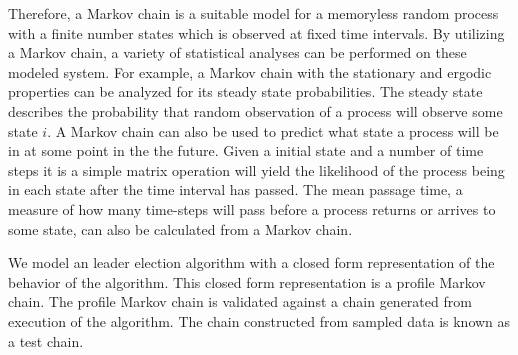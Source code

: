 Therefore, a Markov chain is a suitable model for a memoryless random process with a finite number states which is observed at fixed time intervals. 
By utilizing a Markov chain, a variety of statistical analyses can be performed on these modeled system.
For example, a Markov chain with the stationary and ergodic properties can be analyzed for its steady state probabilities.
The steady state describes the probability that random observation of a process will observe some state $i$.
A Markov chain can also be used to predict what state a process will be in at some point in the the future.
Given a initial state and a number of time steps it is a simple matrix operation will yield the likelihood of the process being in each state after the time interval has passed.
The mean passage time, a measure of how many time-steps will pass before a process returns or arrives to some state, can also be calculated from a Markov chain.

We model an leader election algorithm with a closed form representation of the behavior of the algorithm.
This closed form representation is a profile Markov chain.
The profile Markov chain is validated against a chain generated from execution of the algorithm.
The chain constructed from sampled data is known as a test chain.
